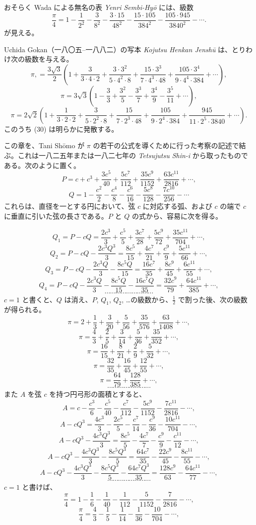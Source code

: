 \documentclass[11pt]{article}
\newcommand{\scanpage}[2]{\clearpage\setcounter{footnote}{0}\noindent{\footnotesize\color{gray}PDF #1 頁 · #2}\par\medskip}
\newcommand{\scanfooter}{}
\newcommand{\dd}{\mathbin{\cdot}}
\begin{document}
おそらく Wada による無名の表 \emph{Yenri Sembi-Hyō} には、級数
\[
\tag{28}\frac{\pi}{4}=1-\frac1{2^2}-\frac3{8^2}-\frac{3\dd15}{48^2}-\frac{15\dd105}{384^2}-\frac{105\dd945}{3840^2}-\cdots.
\]
が見える。

Uchida Gokan（一八〇五--一八八二）の写本 \emph{Kojutsu Henkan Jenshū} は、とりわけ次の級数を与える。
\[
\tag{29}\pi\mathpunct{,}=\frac{3\sqrt3}{2}\left(1+\frac3{3\dd4\dd2}+\frac{3\dd3^2}{5\dd4^2\dd8}+\frac{15\dd3^3}{7\dd4^3\dd48}+\frac{105\dd3^4}{9\dd4^4\dd384}+\cdots\right),
\]
\[
\tag{30}\pi=3\sqrt3\left(1-\frac33+\frac{3^2}{5}-\frac{3^3}{7}+\frac{3^4}{9}-\frac{3^5}{11}+\cdots\right),
\]
\[
\tag{31}\pi=2\sqrt2\left(1+\frac1{3\dd2\dd2}+\frac3{5\dd2^2\dd8}+\frac{15}{7\dd2^3\dd48}+\frac{105}{9\dd2^4\dd384}+\frac{945}{11\dd2^5\dd3840}+\cdots\right).
\]
このうち (30) は明らかに発散する。

この章を、Tani Shōmo が $\pi$ の若干の公式を導くために行った考察の記述で結ぶ。これは一八二五年または一八二七年の \emph{Tetsujutsu Shin-i} から取ったものである。次のように置く。
\[
P=c+c^3+\frac{3c^5}{40}+\frac{5c^7}{112}+\frac{35c^9}{1152}+\frac{63c^{11}}{2816}+\cdots,
\]
\[
Q=1-\frac{c^2}{2}-\frac{c^4}{8}-\frac{c^6}{16}-\frac{5c^8}{128}-\frac{7c^{10}}{256}-\cdots
\]
これらは、直径を一とする円において、弦 $c$ に対応する弧、および $c$ の端で $c$ に垂直に引いた弦の長さである。$P$ と $Q$ の式から、容易に次を得る。
\scanfooter

\scanpage{0230}{第29章結末、印刷頁216}
\[
Q_1=P-cQ=\frac{2c^3}{3}+\frac{c^5}{5}+\frac{3c^7}{28}+\frac{5c^9}{72}+\frac{35c^{11}}{704}+\cdots,
\]
\[
Q_2=P-cQ-\frac{2c^3Q^3}{3}=\frac{8c^5}{15}+\frac{4c^7}{21}+\frac{c^9}{9}+\frac{5c^{11}}{66}+\cdots,
\]
\[
Q_3=P-cQ-\frac{2c^3Q}{3}-\frac{8c^5Q}{15}=\frac{16c^7}{35}+\frac{8c^9}{45}+\frac{6c^{11}}{55}+\cdots,
\]
\[
Q_4=P-cQ-\frac{2c^3Q}{3}-\frac{8c^5Q}{15}-\frac{16c^7Q}{35}=\frac{32c^9}{79}+\frac{64c^{11}}{385}+\cdots,
\]
\[
\cdots\cdots\cdots\cdots\cdots\cdots\cdots\cdots\cdots
\]
$c=1$ と書くと、$Q$ は消え、$P$, $Q_1$, $Q_2$, \ldots の級数から、$\frac12$ で割った後、次の級数が得られる。
\[
\tag{32}\pi=2+\frac13+\frac3{20}+\frac5{56}+\frac{35}{576}+\frac{63}{1408}+\cdots,
\]
\[
\tag{33}\pi=\frac43+\frac25+\frac3{14}+\frac5{36}+\frac{35}{352}+\cdots,
\]
\[
\tag{34}\pi=\frac{16}{15}+\frac8{21}+\frac29+\frac5{32}+\cdots,
\]
\[
\tag{35}\pi=\frac{32}{35}+\frac{16}{45}+\frac{12}{55}+\cdots,
\]
\[
\tag{36}\pi=\frac{64}{79}+\frac{128}{385}+\cdots,
\]
\[
\cdots\cdots\cdots\cdots\cdots\cdots\cdots\cdots
\]
また $A$ を弦 $c$ を持つ円弓形の面積とすると、
\[
A=c-\frac{c^3}{6}-\frac{c^5}{40}-\frac{c^7}{112}-\frac{5c^9}{1152}-\frac{7c^{11}}{2816}-\cdots,
\]
\[
A-cQ^3=\frac{4c^3}{3}-\frac{2c^5}{5}-\frac{c^7}{14}-\frac{c^9}{36}-\frac{10c^{11}}{704}-\cdots,
\]
\[
A-cQ^3-\frac{4c^3Q^3}{3}=\frac{8c^5}{5}-\frac{4c^7}{7}-\frac{c^9}{9}-\frac{c^{11}}{12}-\cdots,
\]
\[
A-cQ^3-\frac{4c^3Q^3}{3}-\frac{8c^5Q^3}{5}=\frac{64c^7}{35}-\frac{22c^9}{45}-\frac{8c^{11}}{55}-\cdots,
\]
\[
A-cQ^3-\frac{4c^3Q^3}{3}-\frac{8c^5Q^3}{5}-\frac{64c^7Q^3}{35}=\frac{128c^9}{63}-\frac{64c^{11}}{77}-\cdots,
\]
\[
\cdots\cdots\cdots\cdots\cdots\cdots\cdots\cdots
\]
$c=1$ と書けば、
\[
\tag{37}\frac{\pi}{4}=1-\frac16-\frac1{40}-\frac1{112}-\frac5{1152}-\frac7{2816}-\cdots,
\]
\[
\tag{38}\frac{\pi}{4}=\frac43-\frac15-\frac1{14}-\frac1{36}-\frac{10}{704}-\cdots,
\]
\scanfooter
\end{document}
